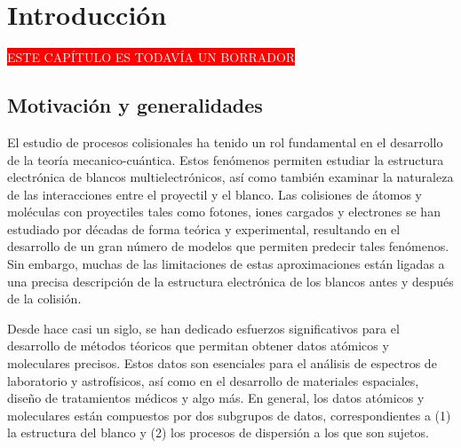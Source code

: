 \chapter{Introducción}

\begin{center}
\colorbox{red}{\textcolor{white}{ESTE CAPÍTULO ES TODAVÍA UN BORRADOR}}
\end{center}

\section{Motivación y generalidades}

El estudio de procesos colisionales ha tenido un rol fundamental en el 
desarrollo de la teoría mecanico-cuántica. Estos fenómenos permiten 
estudiar la estructura electrónica de blancos multielectrónicos, así 
como también examinar la naturaleza de las interacciones entre el 
proyectil y el blanco. Las colisiones de átomos y moléculas con 
proyectiles tales como fotones, iones cargados y electrones se han 
estudiado por décadas de forma teórica y experimental, resultando en
el desarrollo de un gran número de modelos que permiten predecir tales 
fenómenos. Sin embargo, muchas de las limitaciones de estas 
aproximaciones están ligadas a una precisa descripción de la estructura 
electrónica de los blancos antes y después de la colisión. 

Desde hace casi un siglo, se han dedicado esfuerzos significativos para
el desarrollo de métodos téoricos que permitan obtener datos atómicos y 
moleculares precisos. Estos datos son esenciales para el análisis de 
espectros de laboratorio y astrofísicos, así como en el desarrollo de 
materiales espaciales, diseño de tratamientos médicos y {\color{red} 
algo más}. En general, los datos atómicos y moleculares están compuestos
por dos subgrupos de datos, correspondientes a (1) la estructura del 
blanco y (2) los procesos de dispersión a los que son sujetos. 



